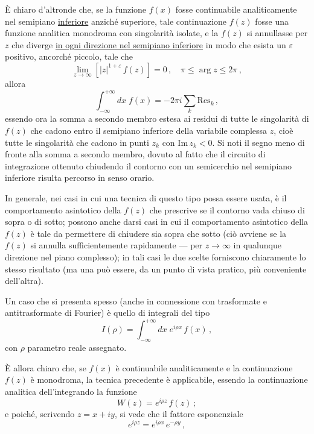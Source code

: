 \documentclass[11pt, a4paper]{book}
\numberwithin{equation}{section}
\begin{document}
È chiaro d'altronde che, se la funzione $f(x)$ fosse continuabile analiticamente nel semipiano \underline{inferiore} anziché superiore, tale continuazione $f(z)$ fosse una funzione analitica monodroma con singolarità isolate, e%
la $f(z)$ si annullasse per $z$ che diverge \underline{in ogni direzione nel semipiano inferiore} in modo che esista un $\varepsilon$ positivo, ancorché piccolo, tale che
\begin{equation}
\lim_{z \to \infty} \left[|z|^{1+\varepsilon}\,f(z)\right] = 0\,, \quad \pi \leq \arg z \leq 2\pi\,, \tag{13}
\end{equation}
allora
\begin{equation}
\int_{-\infty}^{+\infty} dx\; f(x) = -2\pi i \sum_k \mathrm{Res}_k\,, \tag{14}
\end{equation}
essendo ora la somma a secondo membro estesa ai residui di tutte le singolarità di $f(z)$ che cadono entro il semipiano inferiore della variabile complessa $z$, cioè tutte le singolarità che cadono in punti $z_k$ con $\mathrm{Im}\, z_k < 0$. Si noti il segno meno di fronte alla somma a secondo membro, dovuto al fatto che il circuito di integrazione ottenuto chiudendo il contorno con un semicerchio nel semipiano inferiore risulta percorso in senso orario.

In generale, nei casi in cui una tecnica di questo tipo possa essere usata, è il comportamento asintotico della $f(z)$ che prescrive se il contorno vada chiuso di sopra o di sotto; possono anche darsi casi in cui il comportamento asintotico della $f(z)$ è tale da permettere di chiudere sia sopra che sotto (ciò avviene se la $f(z)$ si annulla sufficientemente rapidamente — per $z \to \infty$ in qualunque direzione nel piano complesso); in tali casi le due scelte forniscono chiaramente lo stesso risultato (ma una può essere, da un punto di vista pratico, più conveniente dell'altra).

Un caso che si presenta spesso (anche in connessione con trasformate e antitrasformate di Fourier) è quello di integrali del tipo
\begin{equation}
I(\rho) = \int_{-\infty}^{+\infty} dx\; e^{i\rho x}\, f(x)\,, \tag{15}
\end{equation}
con $\rho$ parametro reale assegnato.

È allora chiaro che, se $f(x)$ è continuabile analiticamente e la continuazione $f(z)$ è monodroma, la tecnica precedente è applicabile, essendo la continuazione analitica dell'integrando la funzione
\begin{equation}
W(z) = e^{i\rho z}\, f(z)\,; \tag{16}
\end{equation}
e poiché, scrivendo $z = x + iy$, si vede che il fattore esponenziale
\begin{equation}
e^{i\rho z} = e^{i\rho x}\, e^{-\rho y}\,, \tag{17}
\end{equation}
\end{document}
